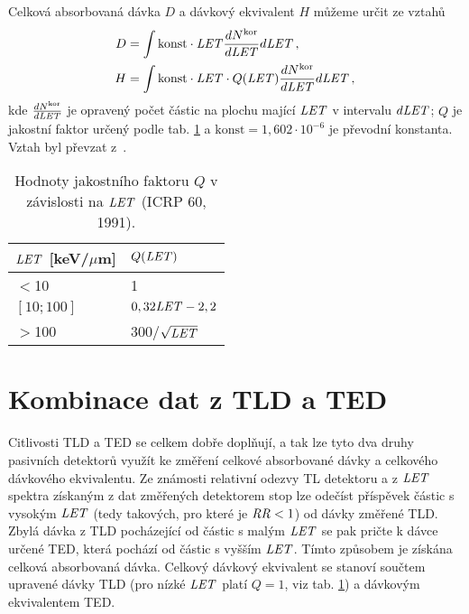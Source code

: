 Celková absorbovaná dávka $D$ a dávkový ekvivalent $H$ můžeme určit ze vztahů 
\begin{align}
  D&=\int\text{konst}\cdot\mathit{LET}\frac{dN^{\text{kor}}}{d\mathit{LET}}d\mathit{LET}\,,\label{eq:Davka}\\
  H&=\int\text{konst}\cdot\mathit{LET}\cdot Q(\mathit{LET})\frac{dN^{\text{kor}}}{d\mathit{LET}}d\mathit{LET}\,,\label{eq:EkvDavka}
\end{align}
kde $\frac{dN^{\text{kor}}}{d\mathit{LET}}$ je opravený počet částic na plochu mající $\mathit{LET}$ v intervalu $d\mathit{LET}$; $Q$ je jakostní faktor určený podle tab. \ref{tab:detektory_Q} a $\text{konst}=1,602\cdot 10^{-6}$ je převodní konstanta. Vztah byl převzat z~\cite{thesisKPBrabcova}.

\begin{table}[H]
  \centering
  \caption{Hodnoty jakostního faktoru $Q$ v závislosti na $\mathit{LET}$ (ICRP 60, 1991).}
  \label{tab:detektory_Q}
  \begin{tabular}{ll}
	\toprule
	$\mathit{LET}$ [keV/$\mu$m]&$Q(\mathit{LET})$ \\
	\midrule
$<$10&1\\
$[10;100]$&$0,32\mathit{LET}-2,2$\\
$>$100&300/$\sqrt{\mathit{LET}}$\\
	\bottomrule
  \end{tabular}
\end{table}
\section{Kombinace dat z TLD a TED}
Citlivosti TLD a TED se celkem dobře doplňují, a tak lze tyto dva druhy pasivních detektorů využít ke změření celkové absorbované dávky a celkového dávkového ekvivalentu. Ze známosti relativní odezvy TL detektoru a z $\mathit{LET}$ spektra získaným z dat změřených detektorem stop lze odečíst příspěvek částic s vysokým $\mathit{LET}$ (tedy takových, pro které je $\mathit{RR}<1$) od dávky změřené TLD. Zbylá dávka z TLD pocházející od částic s malým $\mathit{LET}$ se pak pričte k dávce určené TED, která pochází od částic s vyšším $\mathit{LET}$. Tímto způsobem je získána celková absorbovaná dávka. Celkový dávkový ekvivalent se stanoví součtem upravené dávky TLD (pro nízké $\mathit{LET}$ platí $Q=1$, viz tab. \ref{tab:detektory_Q}) a dávkovým ekvivalentem TED.~\cite{dataTLD_RR}







